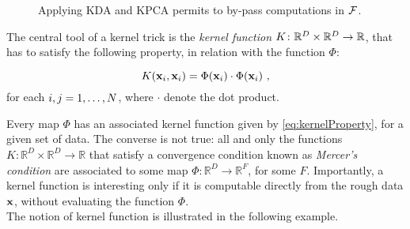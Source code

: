 \begin{figure}
\centering
{
}
\caption{Applying KDA and KPCA permits to by-pass computations in $\mathcal{F}$.}\label{fig:scheme2}
\end{figure}

The central tool of a kernel trick is the \emph{kernel function} $K \colon \mathbb{R}^D \times \mathbb{R}^D \rightarrow \mathbb{R}$, that has to satisfy the following property, in relation with the function $\Phi$:

\begin{equation}\label{eq:kernelProperty}
K(\textbf{x}_i,\textbf{x}_i) = \Phi(\textbf{x}_i)\cdot \Phi(\textbf{x}_i) \mbox{ ,}
\end{equation}
for each $i,j= 1,\dots, N$, where $\cdot$ denote the dot product.


Every map $\Phi$ has an associated kernel function given by \eqref{eq:kernelProperty}, for a given set of data. The converse is not true: all and only the functions $K\colon\mathbb{R}^D\times \mathbb{R}^D \rightarrow \mathbb{R}$ that satisfy a convergence condition known as {\em Mercer's condition} are associated to some map $\Phi:\mathbb{R}^D	\rightarrow \mathbb{R}^F$, for some $F$. Importantly, a kernel function is interesting only if it is computable directly from the rough data $\textbf{x}$, without evaluating the function $\Phi$. \\

The notion of kernel function is illustrated in the following example.

